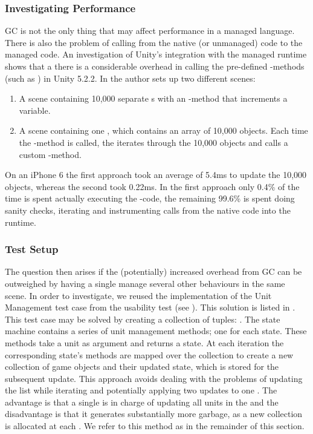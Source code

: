 \subsubsection{Investigating Performance}
\gls{GC} is not the only thing that may affect performance in a managed language. There is also the problem of calling from the native (or unmanaged) code to the managed code. An investigation of Unity's integration with the managed runtime shows that a there is a considerable overhead in calling the pre-defined -methods (such as ) in Unity 5.2.2\cite{unity:runtime:calls}. In \cite{unity:runtime:calls} the author sets up two different scenes:
\begin{enumerate}
    \item A scene containing 10,000 separate s with an -method that increments a variable.
    \item A scene containing one , which contains an array of 10,000 objects. Each time the -method is called, the  iterates through the 10,000 objects and calls a custom -method.
\end{enumerate}
On an iPhone 6 the first approach took an average of 5.4ms to update the 10,000 objects, whereas the second took 0.22ms\cite{unity:runtime:calls}. In the first approach only 0.4\% of the time is spent actually executing the -code, the remaining 99.6\% is spent doing sanity checks, iterating  and instrumenting calls from the native code into the runtime\cite{unity:runtime:calls}.

\subsubsection{Test Setup}
The question then arises if the (potentially) increased overhead from \gls{GC} can be outweighed by having a single  manage several other behaviours in the same scene. In order to investigate, we reused the implementation of the Unit Management test case from the usability test (see ). This solution is listed in . This test case may be solved by creating a collection of tuples: . The state machine contains a series of unit management methods; one for each state. These methods take a unit as argument and returns a state. At each iteration the corresponding state's methods are mapped over the collection to create a new collection of game objects and their updated state, which is stored for the subsequent update. This approach avoids dealing with the problems of updating the list while iterating and potentially applying two updates to one . The advantage is that a single  is in charge of updating all units in the  and the disadvantage is that it generates substantially more garbage, as a new collection is allocated at each . We refer to this method as  in the remainder of this section.

